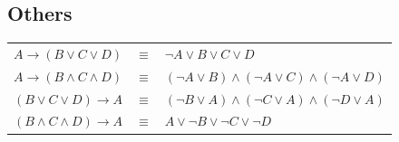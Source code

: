 \documentclass{article}
\begin{document}
\pagebreak

\subsection*{Others}

\begin{tabular}{l l l}
$A \rightarrow (B \vee C \vee D)$ & $\equiv$ & $\neg A \vee B \vee C \vee D$ \\
$A \rightarrow (B \wedge C \wedge D)$ & $\equiv$ & $(\neg A \vee B) \wedge (\neg A \vee C) \wedge (\neg A \vee D)$ \\
$(B \vee C \vee D) \rightarrow A$ & $\equiv$ & $(\neg B \vee A) \wedge (\neg C \vee A) \wedge (\neg D \vee A)$ \\
$(B \wedge C \wedge D) \rightarrow A$ & $\equiv$ & $A \vee \neg B \vee \neg C \vee \neg D$
\end{tabular}
\end{document}
